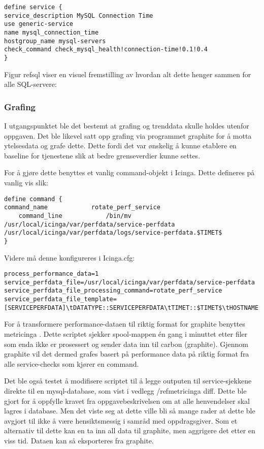 \begin{lstlisting}
define service {
service_description MySQL Connection Time
use generic-service
name mysql_connection_time
hostgroup_name mysql-servers
check_command check_mysql_health!connection-time!0.1!0.4
}
\end{lstlisting}

Figur ref{sql} viser en visuel fremstilling av hvordan alt dette henger sammen for alle SQL-servere:

\subsubsection{Grafing}
I utgangspunktet ble det bestemt at grafing og trenddata skulle holdes utenfor oppgaven. Det ble likevel satt opp grafing via programmet graphite for å motta ytelsesdata og grafe dette. Dette fordi det var ønskelig å kunne etablere en baseline for tjenestene slik at bedre grenseverdier kunne settes.

For å gjøre dette benyttes et vanlig command-objekt i Icinga. Dette defineres på vanlig vis slik:

\begin{lstlisting}
define command {
command_name            rotate_perf_service
    command_line            /bin/mv /usr/local/icinga/var/perfdata/service-perfdata /usr/local/icinga/var/perfdata/logs/service-perfdata.$TIMET$
}
\end{lstlisting}
Videre må denne konfigureres i Icinga.cfg:

\begin{lstlisting}
process_performance_data=1
service_perfdata_file=/usr/local/icinga/var/perfdata/service-perfdata
service_perfdata_file_processing_command=rotate_perf_service
service_perfdata_file_template=[SERVICEPERFDATA]\tDATATYPE::SERVICEPERFDATA\tTIMET::$TIMET$\tHOSTNAME::$HOSTNAME$\tSERVICEDESC::$SERVICEDESC$\tSERVICEPERFDATA::$SERVICEPERFDATA$service_perfdata_file_processing_interval=200
\end{lstlisting}

For å transformere performance-dataen til riktig format for graphite benyttes metricinga \cite{metricinga}. Dette scriptet sjekker spool-mappen én gang i minuttet etter filer som enda ikke er prosessert og sender data inn til carbon (graphite). 
Gjennom graphite vil det dermed grafes basert på performance data på riktig format fra alle service-checks som kjører en command.

Det ble også testet å modifisere scriptet til å legge outputen til service-sjekkene direkte til en mysql-database, som vist i vedlegg /ref{metricinga diff}. Dette ble gjort for å oppfylle kravet fra oppgavebeskrivelsen om at alle henvendelser skal lagres i database. Men det viste seg at dette ville bli så mange rader at dette ble avgjort til ikke å være hensiktsmessig i samråd med oppdragsgiver. Som et alternativ til dette kan en ta inn all data til graphite, men aggrigere det etter en viss tid. Dataen kan så eksporteres fra graphite.

